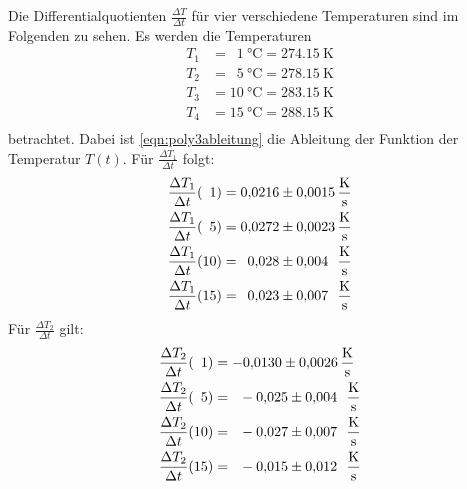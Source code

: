 Die Differentialquotienten $\frac{\Delta T}{\Delta t}$ für vier verschiedene Temperaturen
sind im Folgenden zu sehen. Es werden die Temperaturen
\begin{align*}
    T_1 &= \phantom{1}\SI{1}{\degreeCelsius} = \SI{274.15}{\kelvin} \\ %
    T_2 &=\phantom{1}\SI{5}{\degreeCelsius} = \SI{278.15}{\kelvin}\\
    T_3 &= \SI{10}{\degreeCelsius} = \SI{283.15}{\kelvin}\\
    T_4 &= \SI{15}{\degreeCelsius} = \SI{288.15}{\kelvin}\\
\end{align*}
betrachtet.
Dabei ist \eqref{eqn:poly3ableitung} %
die Ableitung der Funktion der Temperatur $T(t)$.
Für $\frac{\Delta T_1}{\Delta t}$ folgt:
\begin{align*}
    \frac{\Delta T_1}{\Delta t}(\phantom{1}1) &= \num{0.0216 \pm 0.0015} \, \si{\kelvin\per\second}\\
    \frac{\Delta T_1}{\Delta t}(\phantom{1}5) &= \num{0.0272 \pm 0.0023} \, \si{\kelvin\per\second}\\
    \frac{\Delta T_1}{\Delta t}(10) &= \phantom{1}\num{0.028 \pm 0.004}\phantom{1} \, \si{\kelvin\per\second}\\
    \frac{\Delta T_1}{\Delta t}(15) &= \phantom{1}\num{0.023 \pm 0.007}\phantom{1} \, \si{\kelvin\per\second}\\%
\end{align*}
Für $\frac{\Delta T_2}{\Delta t}$ gilt:
\begin{align*}
    \frac{\Delta T_2}{\Delta t}(\phantom{1}1) &= \num{-0.0130 \pm 0.0026} \, \si{\kelvin\per\second}\\ %
    \frac{\Delta T_2}{\Delta t}(\phantom{1}5) &= \phantom{1}\num{-0.025 \pm 0.004}\phantom{1} \, \si{\kelvin\per\second}\\
    \frac{\Delta T_2}{\Delta t}(10) &= \phantom{1}\num{-0.027 \pm 0.007}\phantom{1} \, \si{\kelvin\per\second}\\
    \frac{\Delta T_2}{\Delta t}(15) &= \phantom{1}\num{-0.015 \pm 0.012}\phantom{1} \, \si{\kelvin\per\second}\\
\end{align*}

